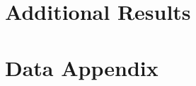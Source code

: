 \newpage
\appendices

\section{Additional Results}
\label{app:additional}

\section{Data Appendix}
\label{app:data}
